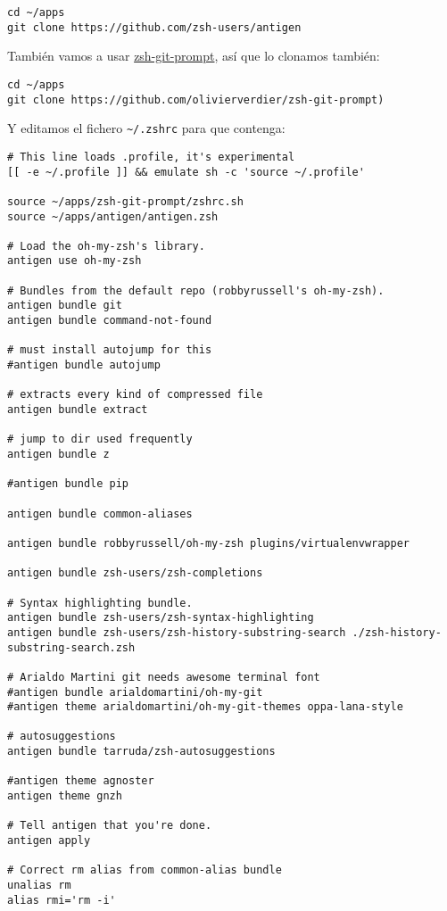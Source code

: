 \documentclass[
  12pt,
  spanish,
]{article}
\begin{document}
\begin{verbatim}
cd ~/apps
git clone https://github.com/zsh-users/antigen
\end{verbatim}

También vamos a usar
\href{https://github.com/olivierverdier/zsh-git-prompt}{zsh-git-prompt},
así que lo clonamos también:

\begin{verbatim}
cd ~/apps
git clone https://github.com/olivierverdier/zsh-git-prompt)
\end{verbatim}

Y editamos el fichero \texttt{\textasciitilde{}/.zshrc} para que
contenga:

\begin{verbatim}
# This line loads .profile, it's experimental
[[ -e ~/.profile ]] && emulate sh -c 'source ~/.profile'

source ~/apps/zsh-git-prompt/zshrc.sh
source ~/apps/antigen/antigen.zsh

# Load the oh-my-zsh's library.
antigen use oh-my-zsh

# Bundles from the default repo (robbyrussell's oh-my-zsh).
antigen bundle git
antigen bundle command-not-found

# must install autojump for this
#antigen bundle autojump

# extracts every kind of compressed file
antigen bundle extract

# jump to dir used frequently
antigen bundle z

#antigen bundle pip

antigen bundle common-aliases

antigen bundle robbyrussell/oh-my-zsh plugins/virtualenvwrapper

antigen bundle zsh-users/zsh-completions

# Syntax highlighting bundle.
antigen bundle zsh-users/zsh-syntax-highlighting
antigen bundle zsh-users/zsh-history-substring-search ./zsh-history-substring-search.zsh

# Arialdo Martini git needs awesome terminal font
#antigen bundle arialdomartini/oh-my-git
#antigen theme arialdomartini/oh-my-git-themes oppa-lana-style

# autosuggestions
antigen bundle tarruda/zsh-autosuggestions

#antigen theme agnoster
antigen theme gnzh

# Tell antigen that you're done.
antigen apply

# Correct rm alias from common-alias bundle
unalias rm
alias rmi='rm -i'
\end{verbatim}
\end{document}
